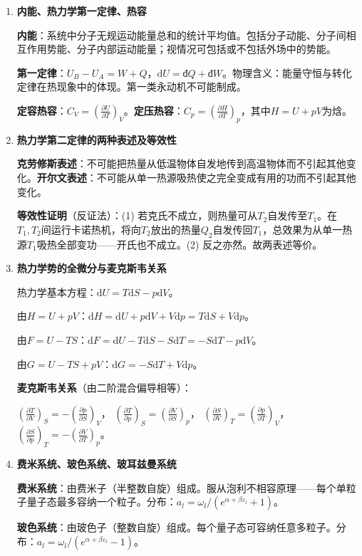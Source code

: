 \documentclass[12pt,a4paper,fontset=mac]{ctexart}
\newcommand{\dd}{\mathrm{d}}
\newcommand{\đ}{\mathrm{đ}}
\begin{document}
\begin{enumerate}
\item \textbf{内能、热力学第一定律、热容}

\textbf{内能}：系统中分子无规运动能量总和的统计平均值。包括分子动能、分子间相互作用势能、分子内部运动能量；视情况可包括或不包括外场中的势能。

\textbf{第一定律}：$U_B-U_A=W+Q$，$\dd U=\đ Q+\đ W$。物理含义：能量守恒与转化定律在热现象中的体现。第一类永动机不可能制成。

\textbf{定容热容}：$C_V=\left(\frac{\partial U}{\partial T}\right)_V$。\textbf{定压热容}：$C_p=\left(\frac{\partial H}{\partial T}\right)_p$，其中$H=U+pV$为焓。

\item \textbf{热力学第二定律的两种表述及等效性}

\textbf{克劳修斯表述}：不可能把热量从低温物体自发地传到高温物体而不引起其他变化。\textbf{开尔文表述}：不可能从单一热源吸热使之完全变成有用的功而不引起其他变化。

\textbf{等效性证明}（反证法）：(1) 若克氏不成立，则热量可从$T_2$自发传至$T_1$。在$T_1,T_2$间运行卡诺热机，将向$T_2$放出的热量$Q_2$自发传回$T_1$，总效果为从单一热源$T_1$吸热全部变功——开氏也不成立。(2) 反之亦然。故两表述等价。

\item \textbf{热力学势的全微分与麦克斯韦关系}

热力学基本方程：$\dd U=T\dd S-p\dd V$。

由$H=U+pV$：$\dd H=\dd U+p\dd V+V\dd p=T\dd S+V\dd p$。

由$F=U-TS$：$\dd F=\dd U-T\dd S-S\dd T=-S\dd T-p\dd V$。

由$G=U-TS+pV$：$\dd G=-S\dd T+V\dd p$。

\textbf{麦克斯韦关系}（由二阶混合偏导相等）：

$\left(\frac{\partial T}{\partial V}\right)_S=-\left(\frac{\partial p}{\partial S}\right)_V$，
$\left(\frac{\partial T}{\partial p}\right)_S=\left(\frac{\partial V}{\partial S}\right)_p$，
$\left(\frac{\partial S}{\partial V}\right)_T=\left(\frac{\partial p}{\partial T}\right)_V$，
$\left(\frac{\partial S}{\partial p}\right)_T=-\left(\frac{\partial V}{\partial T}\right)_p$。

\item \textbf{费米系统、玻色系统、玻耳兹曼系统}

\textbf{费米系统}：由费米子（半整数自旋）组成。服从泡利不相容原理——每个单粒子量子态最多容纳一个粒子。分布：$a_l=\omega_l/(e^{\alpha+\beta\varepsilon_l}+1)$。

\textbf{玻色系统}：由玻色子（整数自旋）组成。每个量子态可容纳任意多粒子。分布：$a_l=\omega_l/(e^{\alpha+\beta\varepsilon_l}-1)$。


\end{enumerate}
\end{document}
